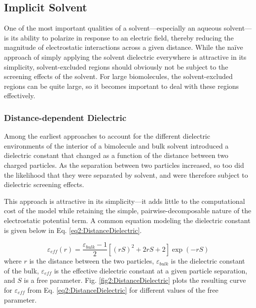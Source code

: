 \subsection{Implicit Solvent}

One of the most important qualities of a solvent---especially an aqueous
solvent---is its ability to polarize in response to an electric field, thereby
reducing the magnitude of electrostatic interactions across a given distance.
While the na\"ive approach of simply applying the solvent dielectric everywhere
is attractive in its simplicity, solvent-excluded regions should obviously not
be subject to the screening effects of the solvent. For large biomolecules, the
solvent-excluded regions can be quite large, so it becomes important to deal
with these regions effectively.

\subsubsection{Distance-dependent Dielectric}

Among the earliest approaches to account for the different dielectric
environments of the interior of a bimolecule and bulk solvent introduced a
dielectric constant that changed as a function of the distance between two
charged particles. As the separation between two particles increased, so too did
the likelihood that they were separated by solvent, and were therefore subject
to dielectric screening effects.

This approach is attractive in its simplicity---it adds little to the
computational cost of the model while retaining the simple,
pairwise-decomposable nature of the electrostatic potential term. A common
equation modeling the dielectric constant is given below in Eq.
\ref{eq2:DistanceDielectric}. \cite{Leach_Book_MolModel_2001}

\begin{equation}
   \varepsilon _ {eff} (r) = \frac {\varepsilon_{bulk} - 1} 2 \left [ (rS) ^2 +
   2rS + 2 \right ] \exp(-rS)
   \label{eq2:DistanceDielectric}
\end{equation}
where $r$ is the distance between the two particles, $\varepsilon_{bulk}$ is the
dielectric constant of the bulk, $\varepsilon_{eff}$ is the effective
dielectric constant at a given particle separation, and $S$ is a free parameter.
Fig. \ref{fig2:DistanceDielectric} plots the resulting curve for
$\varepsilon_{eff}$ from Eq. \ref{eq2:DistanceDielectric} for different values
of the free parameter.

